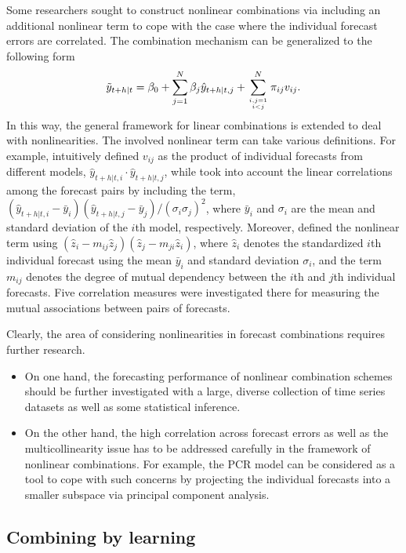 \documentclass[11pt]{article}
\begin{document}
Some researchers sought to construct nonlinear combinations via including an additional nonlinear term to cope with the case where the individual forecast errors are correlated. The combination mechanism can be generalized to the following form
\begin{align*}
\tilde{y}_{t+h|t} =\beta_{0}+\sum_{j=1}^{N} \beta_{j} \hat{y}_{t+h|t, j}+\sum_{i,j=1 \atop i<j}^{N}\pi_{ij}v_{i j}.
\end{align*}
In this way, the general framework for linear combinations is extended to deal with nonlinearities. The involved nonlinear term can take various definitions. For example, \citet{Freitas2006-fn} intuitively defined $v_{i j}$ as the product of individual forecasts from different models, $\hat{y}_{t+h|t, i} \cdot \hat{y}_{t+h|t, j}$, while \citet{Adhikari2012-ur} took into account the linear correlations among the forecast pairs by including the term, $(\hat{y}_{t+h|t, i}-\bar{y}_{i})(\hat{y}_{t+h|t, j}-\bar{y}_{j})/(\sigma_{i}\sigma_{j})^2$, where $\bar{y}_{i}$ and $\sigma_{i}$ are the mean and standard deviation of the $i$th model, respectively. Moreover, \citet{Adhikari2015-bb} defined the nonlinear term using $\left(\hat{z}_{i}-m_{i j} \hat{z}_{j}\right)\left(\hat{z}_{j}-m_{j i} \hat{z}_{i}\right)$, where $\hat{z}_{i}$ denotes the standardized $i$th individual forecast using the mean $\bar{y}_{i}$ and standard deviation $\sigma_{i}$, and the term $m_{i j}$ denotes the degree of mutual dependency between the $i$th and $j$th individual forecasts. Five correlation measures were investigated there for measuring the mutual associations between pairs of forecasts.

Clearly, the area of considering nonlinearities in forecast combinations requires further research.
\begin{itemize}
  \item On one hand, the forecasting performance of nonlinear combination schemes should be further investigated with a large, diverse collection of time series datasets as well as some statistical inference.
  \item On the other hand, the high correlation across forecast errors as well as the multicollinearity issue has to be addressed carefully in the framework of nonlinear combinations. For example, the PCR model can be considered as a tool to cope with such concerns by projecting the individual forecasts into a smaller subspace via principal component analysis.
\end{itemize}

\subsection{Combining by learning}
\label{sec:comb_learn}
\end{document}
